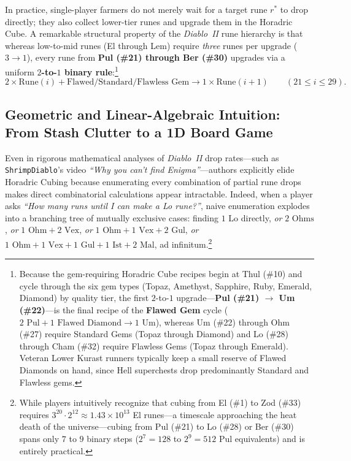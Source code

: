\documentclass[11pt,reqno]{amsart}
\theoremstyle{definition}
\begin{document}
In practice, single-player farmers do not merely wait for a target rune $r^*$ to drop directly; they also collect lower-tier runes and upgrade them in the Horadric Cube. A remarkable structural property of the \emph{Diablo~II} rune hierarchy is that whereas low-to-mid runes (El through Lem) require \emph{three} runes per upgrade ($3 \to 1$), every rune from \textbf{Pul (\#21) through Ber (\#30)} upgrades via a uniform \textbf{$2$-to-$1$ binary rule}:\footnote{Because the gem-requiring Horadric Cube recipes begin at Thul (\#10) and cycle through the six gem types (Topaz, Amethyst, Sapphire, Ruby, Emerald, Diamond) by quality tier, the first $2$-to-$1$ upgrade—\textbf{Pul (\#21) $\to$ Um (\#22)}—is the final recipe of the \textbf{Flawed Gem} cycle ($2\text{ Pul} + 1\text{ Flawed Diamond} \to 1\text{ Um}$), whereas Um (\#22) through Ohm (\#27) require Standard Gems (Topaz through Diamond) and Lo (\#28) through Cham (\#32) require Flawless Gems (Topaz through Emerald). Veteran Lower Kurast runners typically keep a small reserve of Flawed Diamonds on hand, since Hell superchests drop predominantly Standard and Flawless gems.}
\begin{equation}
\label{eq:binary_cube}
    2 \times \text{Rune}(i) + \text{Flawed/Standard/Flawless Gem} \longrightarrow 1 \times \text{Rune}(i+1) \qquad (21 \le i \le 29).
\end{equation}

\subsection{Geometric and Linear-Algebraic Intuition: From Stash Clutter to a 1D Board Game}

Even in rigorous mathematical analyses of \emph{Diablo~II} drop rates—such as \texttt{ShrimpDiablo}'s video \emph{``Why you can't find Enigma''}—authors explicitly elide Horadric Cubing because enumerating every combination of partial rune drops makes direct combinatorial calculations appear intractable. Indeed, when a player asks \emph{``How many runs until I can make a Lo rune?''}, naive enumeration explodes into a branching tree of mutually exclusive cases: finding $1\text{ Lo}$ directly, \emph{or} $2\text{ Ohms}$, \emph{or} $1\text{ Ohm} + 2\text{ Vex}$, \emph{or} $1\text{ Ohm} + 1\text{ Vex} + 2\text{ Gul}$, \emph{or} $1\text{ Ohm} + 1\text{ Vex} + 1\text{ Gul} + 1\text{ Ist} + 2\text{ Mal}$, ad infinitum.\footnote{While players intuitively recognize that cubing from El (\#1) to Zod (\#33) requires $3^{20} \cdot 2^{12} \approx 1.43 \times 10^{13}$ El runes—a timescale approaching the heat death of the universe—cubing from Pul (\#21) to Lo (\#28) or Ber (\#30) spans only $7$ to $9$ binary steps ($2^7 = 128$ to $2^9 = 512$ Pul equivalents) and is entirely practical.}
\end{document}
